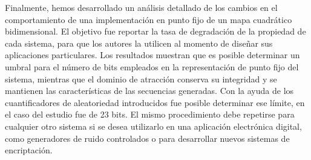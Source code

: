 Finalmente, hemos desarrollado un análisis detallado de los cambios en el comportamiento de una implementación en punto fijo de un mapa cuadrático bidimensional.
El objetivo fue reportar la tasa de degradación de la propiedad de cada sistema, para que los autores la utilicen al momento de diseñar sus aplicaciones particulares.
Los resultados muestran que es posible determinar un umbral para el número de bits empleados en la representación de punto fijo del sistema, mientras que el dominio de atracción conserva su integridad y se mantienen las características de las secuencias generadas.
Con la ayuda de los cuantificadores de aleatoriedad introducidos fue posible determinar ese límite, en el caso del estudio fue de 23 bits.
El mismo procedimiento debe repetirse para cualquier otro sistema si se desea utilizarlo en una aplicación electrónica digital, como generadores de ruido controlados o para desarrollar nuevos sistemas de encriptación.